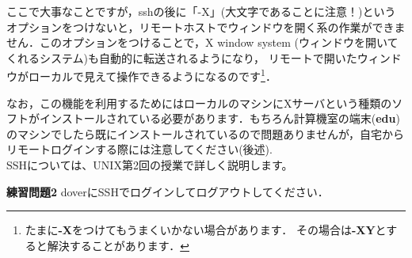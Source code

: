 \documentclass{jarticle}
\begin{document}
ここで大事なことですが，sshの後に「-X」(大文字であることに注意！)というオプションをつけないと，リモートホストでウィンドウを開く系の作業ができません．このオプションをつけることで，X window system (ウィンドウを開いてくれるシステム)も自動的に転送されるようになり，
リモートで開いたウィンドウがローカルで見えて操作できるようになるのです\footnote{たまに{\bf -X}をつけてもうまくいかない場合があります．
その場合は{\bf -XY}とすると解決することがあります．}．

なお，この機能を利用するためにはローカルのマシンにXサーバという種類のソフトがインストールされている必要があります．もちろん計算機室の端末({\bf edu})のマシンでしたら既にインストールされているので問題ありませんが，自宅からリモートログインする際には注意してください(後述).\\

SSHについては、UNIX第2回の授業で詳しく説明します。

\vspace{1em}

\begin{itembox}[l]{\textbf{練習問題2}}
doverにSSHでログインしてログアウトしてください．
\end{itembox}


\end{document}
